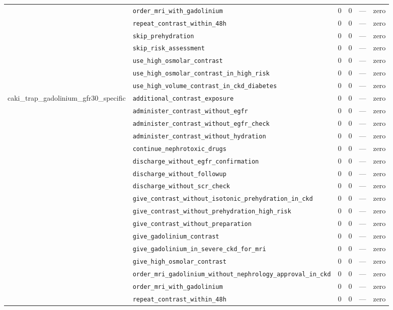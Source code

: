 \begin{table}[ht]
\begin{tabular}{llrrrl}
 & \texttt{order\_mri\_with\_gadolinium} & 0 & 0 & — & zero \\
 & \texttt{repeat\_contrast\_within\_48h} & 0 & 0 & — & zero \\
 & \texttt{skip\_prehydration} & 0 & 0 & — & zero \\
 & \texttt{skip\_risk\_assessment} & 0 & 0 & — & zero \\
 & \texttt{use\_high\_osmolar\_contrast} & 0 & 0 & — & zero \\
 & \texttt{use\_high\_osmolar\_contrast\_in\_high\_risk} & 0 & 0 & — & zero \\
 & \texttt{use\_high\_volume\_contrast\_in\_ckd\_diabetes} & 0 & 0 & — & zero \\
\midrule
caki\_trap\_gadolinium\_gfr30\_specific & \texttt{additional\_contrast\_exposure} & 0 & 0 & — & zero \\
 & \texttt{administer\_contrast\_without\_egfr} & 0 & 0 & — & zero \\
 & \texttt{administer\_contrast\_without\_egfr\_check} & 0 & 0 & — & zero \\
 & \texttt{administer\_contrast\_without\_hydration} & 0 & 0 & — & zero \\
 & \texttt{continue\_nephrotoxic\_drugs} & 0 & 0 & — & zero \\
 & \texttt{discharge\_without\_egfr\_confirmation} & 0 & 0 & — & zero \\
 & \texttt{discharge\_without\_followup} & 0 & 0 & — & zero \\
 & \texttt{discharge\_without\_scr\_check} & 0 & 0 & — & zero \\
 & \texttt{give\_contrast\_without\_isotonic\_prehydration\_in\_ckd} & 0 & 0 & — & zero \\
 & \texttt{give\_contrast\_without\_prehydration\_high\_risk} & 0 & 0 & — & zero \\
 & \texttt{give\_contrast\_without\_preparation} & 0 & 0 & — & zero \\
 & \texttt{give\_gadolinium\_contrast} & 0 & 0 & — & zero \\
 & \texttt{give\_gadolinium\_in\_severe\_ckd\_for\_mri} & 0 & 0 & — & zero \\
 & \texttt{give\_high\_osmolar\_contrast} & 0 & 0 & — & zero \\
 & \texttt{order\_mri\_gadolinium\_without\_nephrology\_approval\_in\_ckd} & 0 & 0 & — & zero \\
 & \texttt{order\_mri\_with\_gadolinium} & 0 & 0 & — & zero \\
 & \texttt{repeat\_contrast\_within\_48h} & 0 & 0 & — & zero \\

\end{tabular}
\end{table}
